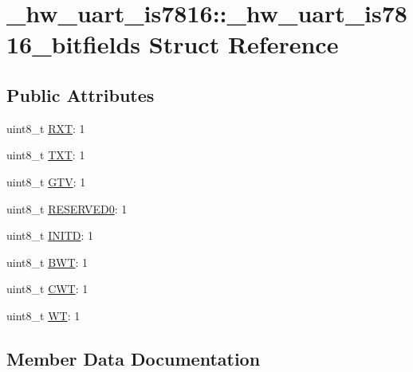 \hypertarget{struct__hw__uart__is7816_1_1__hw__uart__is7816__bitfields}{}\section{\+\_\+hw\+\_\+uart\+\_\+is7816\+:\+:\+\_\+hw\+\_\+uart\+\_\+is7816\+\_\+bitfields Struct Reference}
\label{struct__hw__uart__is7816_1_1__hw__uart__is7816__bitfields}
\subsection*{Public Attributes}
\begin{DoxyCompactItemize}
\item 
uint8\+\_\+t \hyperlink{struct__hw__uart__is7816_1_1__hw__uart__is7816__bitfields_a7b817811ff33a9704d8fd59436ea7c6b}{R\+XT}\+: 1
\item 
uint8\+\_\+t \hyperlink{struct__hw__uart__is7816_1_1__hw__uart__is7816__bitfields_a8c3c60cf71e1325bc2e723bf844721ea}{T\+XT}\+: 1
\item 
uint8\+\_\+t \hyperlink{struct__hw__uart__is7816_1_1__hw__uart__is7816__bitfields_a2e3463bce6fa901189f246d8cc2ff746}{G\+TV}\+: 1
\item 
uint8\+\_\+t \hyperlink{struct__hw__uart__is7816_1_1__hw__uart__is7816__bitfields_ac8767004f19ff47e6183a1efc623a29b}{R\+E\+S\+E\+R\+V\+E\+D0}\+: 1
\item 
uint8\+\_\+t \hyperlink{struct__hw__uart__is7816_1_1__hw__uart__is7816__bitfields_a5cb76ad36c73071b6ed847d078575588}{I\+N\+I\+TD}\+: 1
\item 
uint8\+\_\+t \hyperlink{struct__hw__uart__is7816_1_1__hw__uart__is7816__bitfields_a8ab6f9eab7361fb3b960000d893329ca}{B\+WT}\+: 1
\item 
uint8\+\_\+t \hyperlink{struct__hw__uart__is7816_1_1__hw__uart__is7816__bitfields_af048973b6606dab2afaed8bebe38f465}{C\+WT}\+: 1
\item 
uint8\+\_\+t \hyperlink{struct__hw__uart__is7816_1_1__hw__uart__is7816__bitfields_af550c6fe4047e6ea0e6aaff637fe2154}{WT}\+: 1
\end{DoxyCompactItemize}


\subsection{Member Data Documentation}
